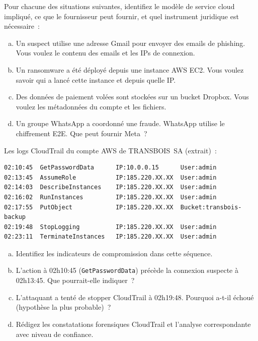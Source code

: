 \bigskip

\begin{boxexo}[title={\ding{45}\quad Exercice~17.1. Modèle et preuves \niveaubase}]
Pour chacune des situations suivantes, identifiez le modèle de service
cloud impliqué, ce que le fournisseur peut fournir, et quel instrument
juridique est nécessaire~:
\begin{enumerate}[(a)]
    \item Un suspect utilise une adresse Gmail pour envoyer des emails
          de phishing. Vous voulez le contenu des emails et les IPs
          de connexion.
    \item Un ransomware a été déployé depuis une instance AWS EC2.
          Vous voulez savoir qui a lancé cette instance et depuis quelle IP.
    \item Des données de paiement volées sont stockées sur un bucket
          Dropbox. Vous voulez les métadonnées du compte et les fichiers.
    \item Un groupe WhatsApp a coordonné une fraude. WhatsApp utilise
          le chiffrement E2E. Que peut fournir Meta~?
\end{enumerate}
\end{boxexo}

\begin{boxexo}[title={\ding{45}\quad Exercice~17.2. Analyse CloudTrail \niveaumoyen}]
Les logs CloudTrail du compte AWS de TRANSBOIS~SA (extrait)~:
\begin{lstlisting}[language=bash_forensique]
02:10:45  GetPasswordData      IP:10.0.0.15      User:admin
02:13:45  AssumeRole           IP:185.220.XX.XX  User:admin
02:14:03  DescribeInstances    IP:185.220.XX.XX  User:admin
02:16:02  RunInstances         IP:185.220.XX.XX  User:admin
02:17:55  PutObject            IP:185.220.XX.XX  Bucket:transbois-backup
02:19:48  StopLogging          IP:185.220.XX.XX  User:admin
02:23:11  TerminateInstances   IP:185.220.XX.XX  User:admin
\end{lstlisting}
\begin{enumerate}[(a)]
    \item Identifiez les indicateurs de compromission dans cette séquence.
    \item L'action à 02h10:45 (\texttt{GetPasswordData}) précède
          la connexion suspecte à 02h13:45. Que pourrait-elle indiquer~?
    \item L'attaquant a tenté de stopper CloudTrail à 02h19:48.
          Pourquoi a-t-il échoué (hypothèse la plus probable)~?
    \item Rédigez les constatations forensiques CloudTrail et
          l'analyse correspondante avec niveau de confiance.
\end{enumerate}
\end{boxexo}

